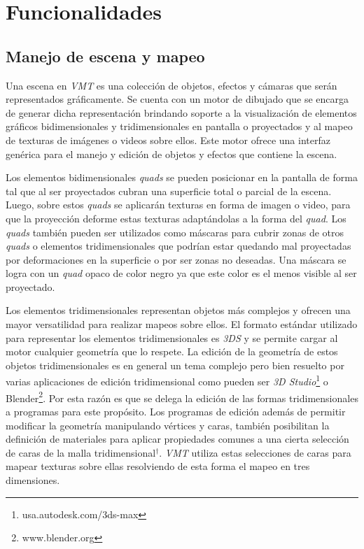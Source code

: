 \section{Funcionalidades}

\subsection{Manejo de escena y mapeo}

Una escena en \emph{VMT} es una colección de objetos, efectos y cámaras que serán representados gráficamente. Se cuenta con un motor de dibujado que se encarga de generar dicha representación brindando soporte a la visualización de elementos gráficos bidimensionales y tridimensionales en pantalla o proyectados y al mapeo de texturas de imágenes o videos sobre ellos. Este motor ofrece una interfaz genérica para el manejo y edición de objetos y efectos que contiene la escena.

Los elementos bidimensionales \emph{quads} se pueden posicionar en la pantalla de forma tal que al ser proyectados cubran una superficie total o parcial de la escena. Luego, sobre estos \emph{quads} se aplicarán texturas en forma de imagen o video, para que la proyección deforme estas texturas adaptándolas a la forma del \emph{quad}.
Los \emph{quads} también pueden ser utilizados como máscaras para cubrir zonas de otros \emph{quads} o elementos tridimensionales que podrían estar quedando mal proyectadas por deformaciones en la superficie o por ser zonas no deseadas. Una máscara se logra con un \emph{quad} opaco de color negro ya que este color es el menos visible al ser proyectado.

Los elementos tridimensionales representan objetos más complejos y ofrecen una mayor versatilidad para realizar mapeos sobre ellos.
El formato estándar utilizado para representar los elementos tridimensionales es \emph{3DS} \cite{3DS} y se permite cargar al motor cualquier geometría que lo respete.
La edición de la geometría de estos objetos tridimensionales es en general un tema complejo pero bien resuelto por varias aplicaciones de edición tridimensional como pueden ser \emph{3D Studio}\footnote{usa.autodesk.com/3ds-max} o Blender\footnote{www.blender.org}. Por esta razón es que se delega la edición de las formas tridimensionales a programas para este propósito.
Los programas de edición además de permitir modificar la geometría manipulando vértices y caras, también posibilitan la definición de materiales para aplicar propiedades comunes a una cierta selección de caras de la malla tridimensional$^\dagger$. \emph{VMT} utiliza estas selecciones de caras para mapear texturas sobre ellas resolviendo de esta forma el mapeo en tres dimensiones.

